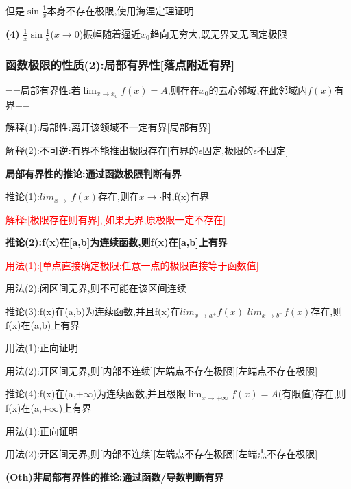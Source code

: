 \documentclass[11pt,a4paper,UTF8]{ctexart}
\begin{document}
\begin{solbox}[{分步推导与答题规范}]
  但是$\sin\frac{1}{x}$本身不存在极限,使用海涅定理证明
\end{solbox}

\textbf{(4)} $\frac{1}{x} \sin\frac{1}{x}$($x \to 0$)振幅随着逼近$x_0$趋向无穷大,既无界又无固定极限


\subsubsection{函数极限的性质(2):局部有界性[落点附近有界]}

==\textit{}局部有界性:若$\lim_{x \to x_0} f(x) = A$,则存在$x_0$的去心邻域,在此邻域内$f(x)$有界\textit{}==

\begin{solbox}[{分步推导与答题规范}]
解释(1):局部性:离开该领域不一定有界[局部有界]

解释(2):不可逆:有界不能推出极限存在[有界的$\epsilon$固定,极限的$\epsilon$不固定]
\end{solbox}

\textbf{局部有界性的推论:通过函数极限判断有界}

\begin{solbox}[{分步推导与答题规范}]
\textit{}推论(1):$lim _{x\rightarrow \cdot}f(x)$存在,则在$x\rightarrow \cdot$时,f(x)有界\textit{}

\textcolor{red}{解释:[极限存在则有界],[如果无界,原极限一定不存在]}

\textbf{推论(2):f(x)在[a,b]为连续函数,则f(x)在[a,b]上有界}

\textcolor{red}{用法(1):[单点直接确定极限:任意一点的极限直接等于函数值]}

用法(2):闭区间无界,则不可能在该区间连续

\textit{}推论(3):f(x)在(a,b)为连续函数,并且f(x)在$lim _{x\rightarrow a^+}f(x)$ $lim _{x\rightarrow b^-}f(x)$存在,则f(x)在(a,b)上有界\textit{}

用法(1):正向证明

用法(2):开区间无界,则[内部不连续][左端点不存在极限][左端点不存在极限]

\textit{}推论(4):f(x)在(a,$+\infty$)为连续函数,并且极限$\lim_{x \to +\infty} f(x) = A$(有限值)存在,则f(x)在(a,$+\infty$)上有界\textit{}

用法(1):正向证明

用法(2):开区间无界,则[内部不连续][左端点不存在极限][左端点不存在极限]
\end{solbox}

\textbf{(Oth)非局部有界性的推论:通过函数/导数判断有界}
\end{document}
